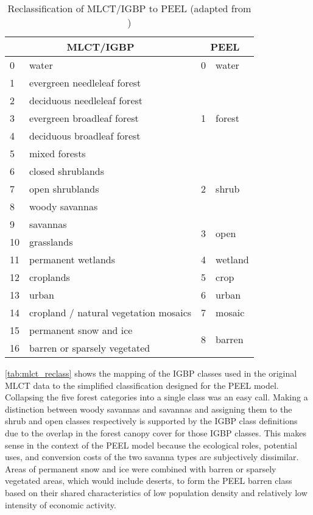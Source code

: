 \begin{center}
  \begin{table}[htbp]
    \begin{tabular}{|l|l|l|l|}
      \hline
      \multicolumn{2}{|c|}{MLCT/IGBP} & \multicolumn{2}{|c|}{PEEL} \\
      \hline
      0 & water & 0 & water \\
      \hline
      1 & evergreen needleleaf forest & \multirow{5}{*}{1} & \multirow{5}{*}{forest} \\
      2 & deciduous needleleaf forest & & \\
      3 & evergreen broadleaf forest & & \\
      4 & deciduous broadleaf forest & & \\
      5 & mixed forests & & \\
      \hline
      6 & closed shrublands & \multirow{3}{*}{2} & \multirow{3}{*}{shrub} \\
      7 & open shrublands & & \\
      8 & woody savannas & & \\
      \hline
      9 & savannas & \multirow{2}{*}{3} & \multirow{2}{*}{open} \\
      10 & grasslands & & \\
      \hline
      11 & permanent wetlands & 4 & wetland \\
      \hline
      12 & croplands & 5 & crop \\
      \hline
      13 & urban & 6 & urban \\
      \hline
      14 & cropland / natural vegetation mosaics & 7 & mosaic \\
      \hline
      15 & permanent snow and ice & \multirow{2}{*}{8} & \multirow{2}{*}{barren} \\
      16 & barren or sparsely vegetated & & \\  
      \hline
    \end{tabular}
    \caption{Reclassification of MLCT/IGBP to PEEL (adapted from \citet{Friedl2002})}
    \label{tab:mlct_reclass}
  \end{table}
\end{center}

\autoref{tab:mlct_reclass} shows the mapping of the IGBP classes used
in the original MLCT data to the simplified classification designed
for the PEEL model.  Collapsing the five forest categories into a
single class was an easy call.  Making a distinction between woody
savannas and savannas and assigning them to the shrub and open classes
respectively is supported by the IGBP class definitions
\citep{Friedl2002} due to the overlap in the forest canopy cover for
those IGBP classes.  This makes sense in the context of the PEEL model
because the ecological roles, potential uses, and conversion costs of
the two savanna types are subjectively dissimilar.  Areas of permanent
snow and ice were combined with barren or sparsely vegetated areas,
which would include deserts, to form the PEEL barren class based on
their shared characteristics of low population density and relatively
low intensity of economic activity.





